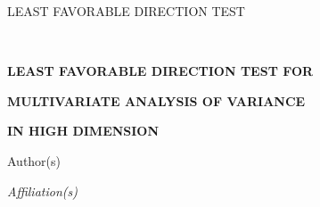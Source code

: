 \documentclass[12pt]{article} %
\theoremstyle{definition}
\begin{document}

\renewcommand{\baselinestretch}{2}


{\hfill {\footnotesize\rm LEAST FAVORABLE DIRECTION TEST} \hfill}

\renewcommand{\thefootnote}{}
$\ $\par


\fontsize{12}{14pt plus.8pt minus .6pt}\selectfont \vspace{0.8pc}
\centerline{\large\bf LEAST FAVORABLE DIRECTION TEST FOR }
\vspace{2pt} \centerline{\large\bf MULTIVARIATE ANALYSIS OF VARIANCE}
\vspace{2pt} \centerline{\large\bf IN HIGH DIMENSION}
\vspace{.4cm} \centerline{Author(s)} \vspace{.4cm} \centerline{\it
Affiliation(s)} \vspace{.55cm} \fontsize{9}{11.5pt plus.8pt minus
.6pt}\selectfont

\end{document}
